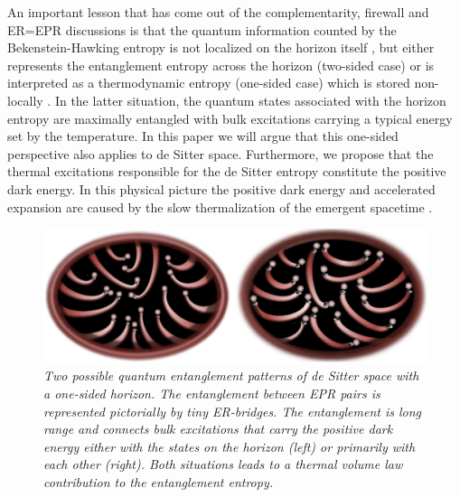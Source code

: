 \documentclass[a4paper,12pt]{article}
\begin{document}
An important lesson that has come out of the complementarity, firewall \cite{AMPS} and ER=EPR \cite{ER=EPR} discussions  is that the quantum information counted by 
the Bekenstein-Hawking entropy is not localized on the horizon itself \cite{Giddings}, but either represents the entanglement entropy across the horizon (two-sided case) or is interpreted as a thermodynamic entropy (one-sided case) which is stored non-locally . 
In the latter situation, the quantum states associated with the horizon entropy are maximally entangled with bulk excitations carrying a typical energy set by the temperature. In this paper we will argue that this one-sided perspective also applies to de Sitter space. Furthermore, we propose that the thermal excitations responsible for the de Sitter entropy constitute the positive dark energy.  %
In this physical picture the positive dark energy and accelerated expansion are caused by the slow thermalization of the emergent spacetime \cite{EPV2011, FastScrambler}.

\begin{figure}[btp]
\begin{center}
\vspace{-1 cm}
\includegraphics[scale=0.60]{SelfEntangledUniverse5.pdf}
\vspace{-0.2  cm}
\caption{\small \it Two possible quantum entanglement patterns of de Sitter space with a one-sided horizon. The entanglement between EPR pairs is represented pictorially by tiny ER-bridges. The entanglement is long range and connects bulk excitations that carry the positive dark energy either with the states on the horizon (left) or primarily with each other (right). Both situations leads to a thermal volume law contribution to the entanglement entropy.} %
\end{center}
\vspace{-0.6 cm}
\end{figure}
\end{document}
